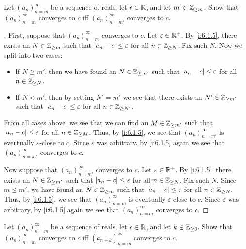 \begin{ex}\label{i:ex:6.1.3}
  Let \((a_n)_{n = m}^\infty\) be a sequence of reals, let \(c \in \mathbb{R}\), and let \(m' \in \mathbb{Z}_{\geq m}\).
  Show that \((a_n)_{n = m}^\infty\) converges to \(c\) iff \((a_n)_{n = m'}^\infty\) converges to \(c\).
\end{ex}

\begin{proof}[]
  First, suppose that \((a_n)_{n = m}^\infty\) converges to \(c\).
  Let \(\varepsilon \in \mathbb{R}^+\).
  By \cref{i:6.1.5}, there exists an \(N \in \mathbb{Z}_{\geq m}\) such that \(\left\lvert a_n - c\right\rvert \leq \varepsilon\) for all \(n \in \mathbb{Z}_{\geq N}\).
  Fix such \(N\).
  Now we split into two cases:
  \begin{itemize}
    \item If \(N \geq m'\), then we have found an \(N \in \mathbb{Z}_{\geq m'}\) such that \(\left\lvert a_n - c\right\rvert \leq \varepsilon\) for all \(n \in \mathbb{Z}_{\geq N}\).
    \item If \(N < m'\), then by setting \(N' = m'\) we see that there exists an \(N' \in \mathbb{Z}_{\geq m'}\) such that \(\left\lvert a_n - c\right\rvert \leq \varepsilon\) for all \(n \in \mathbb{Z}_{\geq N'}\).
  \end{itemize}
  From all cases above, we see that we can find an \(M \in \mathbb{Z}_{\geq m'}\) such that \(\left\lvert a_n - c\right\rvert \leq \varepsilon\) for all \(n \in \mathbb{Z}_{\geq M}\).
  Thus, by \cref{i:6.1.5}, we see that \((a_n)_{n = m'}^\infty\) is eventually \(\varepsilon\)-close to \(c\).
  Since \(\varepsilon\) was arbitrary, by \cref{i:6.1.5} again we see that \((a_n)_{n = m'}^\infty\) converges to \(c\).

  Now suppose that \((a_n)_{n = m'}^\infty\) converges to \(c\).
  Let \(\varepsilon \in \mathbb{R}^+\).
  By \cref{i:6.1.5}, there exists an \(N \in \mathbb{Z}_{\geq m'}\) such that \(\left\lvert a_n - c\right\rvert \leq \varepsilon\) for all \(n \in \mathbb{Z}_{\geq N}\).
  Fix such \(N\).
  Since \(m \leq m'\), we have found an \(N \in \mathbb{Z}_{\geq m}\) such that \(\left\lvert a_n - c\right\rvert \leq \varepsilon\) for all \(n \in \mathbb{Z}_{\geq N}\).
  Thus, by \cref{i:6.1.5}, we see that \((a_n)_{n = m}^\infty\) is eventually \(\varepsilon\)-close to \(c\).
  Since \(\varepsilon\) was arbitrary, by \cref{i:6.1.5} again we see that \((a_n)_{n = m}^\infty\) converges to \(c\).
\end{proof}

\begin{ex}\label{i:ex:6.1.4}
  Let \((a_n)_{n = m}^\infty\) be a sequence of reals, let \(c \in \mathbb{R}\), and let \(k \in \mathbb{Z}_{\geq 0}\).
  Show that \((a_n)_{n = m}^\infty\) converges to \(c\) iff \((a_{n + k})_{n = m}^\infty\) converges to \(c\).
\end{ex}

